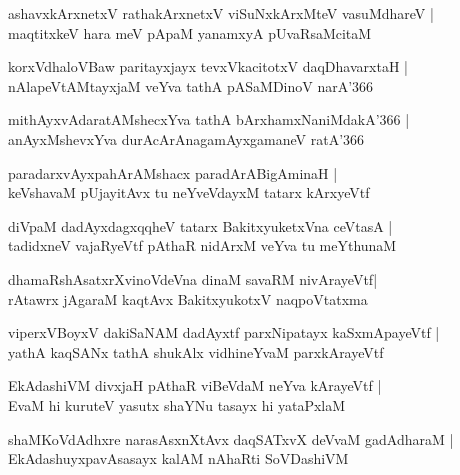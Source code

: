 \documentclass[twoside,12pt,openright]{book}
\newcounter{shloka}[chapter]
\begin{document}
\begin{shloka}%
ashavxkArxnetxV rathakArxnetxV viSuNxkArxMteV vasuMdhareV |\\
maqtitxkeV hara meV pApaM yanamxyA pUvaRsaMcitaM
\end{shloka}

\begin{shloka}%
korxVdhaloVBaw paritayxjayx tevxVkacitotxV daqDhavarxtaH |\\
nAlapeVtAMtayxjaM veYva tathA pASaMDinoV narA\char'366
\end{shloka}

\begin{shloka}%
mithAyxvAdaratAMshecxYva tathA bArxhamxNaniMdakA\char'366 |\\
anAyxMshevxYva durAcArAnagamAyxgamaneV ratA\char'366
\end{shloka}

\begin{shloka}%
paradarxvAyxpahArAMshacx paradArABigAminaH |\\
keVshavaM pUjayitAvx tu neYveVdayxM tatarx kArxyeVtf
\end{shloka}

\begin{shloka}%
diVpaM dadAyxdagxqqheV tatarx BakitxyuketxVna ceVtasA |\\
tadidxneV vajaRyeVtf pAthaR nidArxM veYva tu meYthunaM
\end{shloka}

\begin{shloka}%
dhamaRshAsatxrXvinoVdeVna dinaM savaRM nivArayeVtf|\\
rAtawrx jAgaraM kaqtAvx BakitxyukotxV naqpoVtatxma
\end{shloka}

\begin{shloka}%
viperxVBoyxV dakiSaNAM dadAyxtf parxNipatayx kaSxmApayeVtf |\\
yathA kaqSANx tathA shukAlx vidhineYvaM parxkArayeVtf
\end{shloka}

\begin{shloka}%
EkAdashiVM divxjaH pAthaR viBeVdaM neYva kArayeVtf |\\
EvaM hi kuruteV yasutx shaYNu tasayx hi yataPxlaM 
\end{shloka}

\begin{shloka}%
shaMKoVdAdhxre narasAsxnXtAvx daqSATxvX deVvaM gadAdharaM |\\
EkAdashuyxpavAsasayx kalAM nAhaRti SoVDashiVM
\end{shloka}
\end{document}
